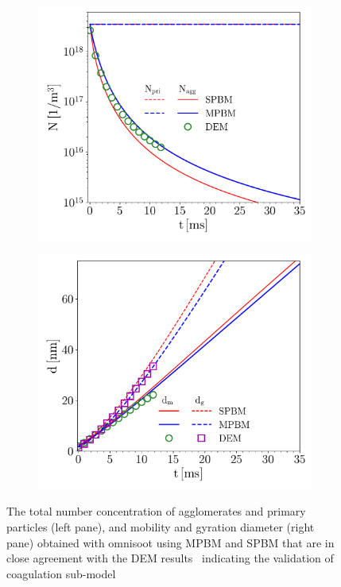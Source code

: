 \begin{figure}[!htbp]
	\centering
	\begin{subfigure}[t]{0.4\textwidth}
		\centering
		\includegraphics[width=1\textwidth]{Figures/Results/Validation/Coagulation/N_agg_pri.pdf}
	\end{subfigure}
	\begin{subfigure}[t]{0.4\textwidth}
		\centering
		\includegraphics[width=1\textwidth]{Figures/Results/Validation/Coagulation/d_mg.pdf}
	\end{subfigure}
	\caption{The total number concentration of agglomerates and primary particles (left pane), and mobility and gyration diameter (right pane) obtained with omnisoot using MPBM and SPBM that are in close agreement with the DEM results~\citep{kholghy2021surface} indicating the validation of coagulation sub-model}
	\label{fig:coagvalid_Nd}
\end{figure}


